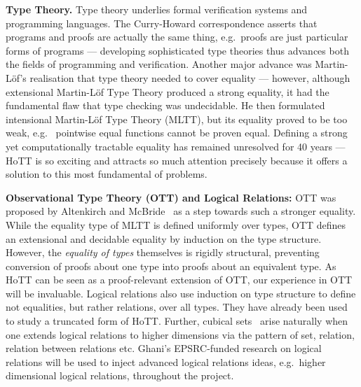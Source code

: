 \documentclass[a4paper,11pt]{article}
\newcommand{\eg}{{e.g.}\ }
\begin{document}
{\bf Type Theory.} Type theory underlies formal verification systems and
programming languages. The
Curry-Howard correspondence asserts that programs and proofs are
actually the same thing, \eg proofs are just particular forms of
programs --- developing sophisticated type theories thus advances both 
the fields of programming and verification. Another
major advance was Martin-L\"of's realisation that type theory needed
to cover equality --- however, although 
extensional Martin-L\"of Type Theory produced
a strong equality, it had the fundamental flaw that type
checking was undecidable. He then formulated intensional Martin-L\"of
Type Theory (MLTT), but its equality proved to be too weak, \eg
pointwise equal functions cannot be proven equal. Defining a strong yet
computationally tractable equality has remained unresolved for 40
years --- HoTT is so exciting and attracts so much attention precisely because it offers a
solution to this most fundamental of problems.

{\bf Observational Type Theory (OTT) and Logical Relations:} OTT was
proposed by Altenkirch and McBride~\cite{alti:ott-conf} as a step
towards such a stronger equality. While the equality type of MLTT is
defined uniformly over types, OTT defines an extensional and decidable
equality by induction on the type structure. However, the {\em
  equality of types} themselves is rigidly structural, preventing
conversion of proofs about one type into proofs about an equivalent
type. As HoTT can be seen as a proof-relevant extension of OTT, our
experience in OTT will be invaluable. Logical relations also use
induction on type structure to define not equalities, but rather
relations, over all types. They have already been
used~\cite{licataHarper:canonicity2d} to study a truncated form of
HoTT. Further, cubical sets~\cite{BezemM:cubsmt} arise naturally when
one extends logical relations to higher dimensions via the pattern of
set, relation, relation between relations etc. Ghani's EPSRC-funded
research on logical relations will be used to inject advanced logical
relations ideas, \eg higher dimensional logical relations, throughout
the project.



\end{document}

